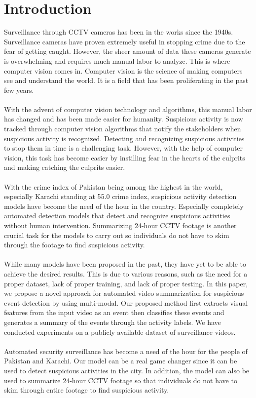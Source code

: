 \documentclass[title page]{article}
\begin{document}
\section{Introduction}

Surveillance through CCTV cameras has been in the works since the 1940s. Surveillance cameras have proven extremely useful in stopping crime due to the fear of getting caught. However, the sheer amount of data these cameras generate is overwhelming and requires much manual labor to analyze. This is where computer vision comes in. Computer vision is the science of making computers see and understand the world. It is a field that has been proliferating in the past few years. 
\\ \\
With the advent of computer vision technology and algorithms, this manual labor has changed and has been made easier for humanity. Suspicious activity is now tracked through computer vision algorithms that notify the stakeholders when suspicious activity is recognized. Detecting and recognizing suspicious activities to stop them in time is a challenging task. However, with the help of computer vision, this task has become easier by instilling fear in the hearts of the culprits and making catching the culprits easier.
\\ \\
With the crime index of Pakistan being among the highest in the world, especially Karachi standing at 55.0 crime index, suspicious activity detection models have become the need of the hour in the country. Especially completely automated detection models that detect and recognize suspicious activities without human intervention. Summarizing 24-hour CCTV footage is another crucial task for the models to carry out so individuals do not have to skim through the footage to find suspicious activity.
\\ \\
While many models have been proposed in the past, they have yet to be able to achieve the desired results. This is due to various reasons, such as the need for a proper dataset, lack of proper training, and lack of proper testing. In this paper, we propose a novel approach for automated video summarization for suspicious event detection by using multi-modal. Our proposed method first extracts visual features from the input video as an event then classifies these events and generates a summary of the events through the activity labels. We have conducted experiments on a publicly available dataset of surveillance videos. 
\\ \\
Automated security surveillance has become a need of the hour for the people of Pakistan and Karachi. Our model can be a real game changer since it can be used to detect suspicious activities in the city. In addition, the model can also be used to summarize 24-hour CCTV footage so that individuals do not have to skim through entire footage to find suspicious activity.
\end{document}
